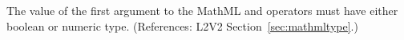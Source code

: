 The value of the first argument to the MathML  and
 operators must have either boolean or numeric
type.  (References: L2V2 Section~\ref{sec:mathmltype}.)
